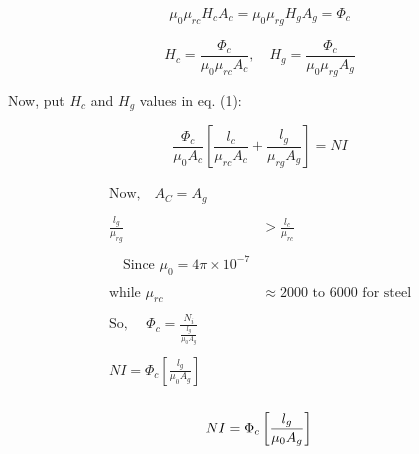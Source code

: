 \documentclass{article}
\begin{document}
\begin{equation}
    \mu_0 \mu_{rc} H_c A_c = \mu_0 \mu_{rg} H_g A_g = \Phi_c \tag{3}
\end{equation}

\begin{equation*}
    H_c = \frac{\Phi_c}{\mu_0\mu_{rc} A_c}, \quad H_g = \frac{\Phi_c}{\mu_0\mu_{rg} A_g}
\end{equation*}

Now, put \( H_c \) and \( H_g \) values in eq. (1):

\begin{equation}
    \frac{\Phi_c}{\mu_0 A_c} \left[ \frac{l_c}{\mu_{rc} A_c} + \frac{l_g}{\mu_{rg} A_g} \right] = NI
\end{equation}

\begin{align*}
\begin{split}
    \text{Now,} \quad A_C = A_g \\[0.5cm]\\
    \frac{l_g}{\mu_{rg}} &> \frac{l_c}{\mu_{rc}}\\[0.5cm] \\
   \quad \text{Since } \mu_0 = 4\pi \times 10^{-7}\\[0.5cm] \\
    \text{while } \mu_{rc} &\approx 2000 \text{ to } 6000 \text{ for steel}\\[0.5cm] \\
    \text{So, } \quad \Phi_c = \frac{N_i}{\frac{l_g}{\mu_0 A_g}}\\[0.5cm] \\
    NI = \Phi_c \left[ \frac{l_g}{\mu_0 A_g} \right] \\ 
\end{split}
\end{align*}

\begin{tcolorbox}[colframe=red, boxrule=1mm, sharp corners=south] %
\[
    NI = \Phi_c \left[ \frac{l_g}{\mu_0 A_g} \right] \\ 
\]
\end{tcolorbox}
\end{document}
